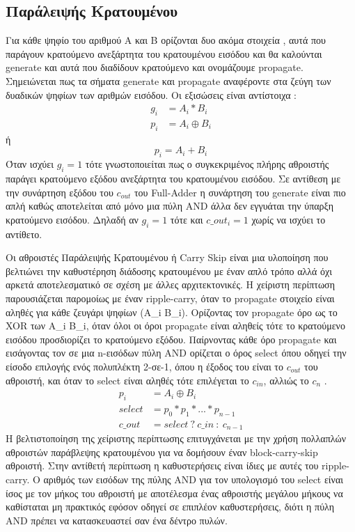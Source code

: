\subsection{Παράλειψής Κρατουμένου}
Για κάθε ψηφίο του αριθμού Α και Β ορίζονται δυο ακόμα στοιχεία , αυτά που παράγουν κρατούμενο ανεξάρτητα του κρατουμένου εισόδου και θα καλούνται generate και αυτά που διαδίδουν κρατούμενο και ονομάζουμε propagate. Σημειώνεται πως τα σήματα generate και propagate αναφέροντε στα ζεύγη των δυαδικών ψηφίων των αριθμών εισόδου. Οι εξισώσεις είναι αντίστοιχα :
\begin{equation}
\begin{split}
    g_i &= A_i * B_i  \\
    p_i &= A_i \oplus B_i 
\end{split}
\end{equation}
ή
\begin{equation*}
    p_i = A_i + B_i
\end{equation*}
Όταν ισχύει $g_i=1$ τότε γνωστοποιείται πως ο συγκεκριμένος πλήρης αθροιστής παράγει κρατούμενο εξόδου ανεξάρτητα του κρατουμένου εισόδου. Σε αντίθεση με την συνάρτηση εξόδου του $c_{out}$ του Full-Adder η συνάρτηση του generate είναι πιο απλή καθώς αποτελείται από μόνο μια πύλη AND άλλα δεν εγγυάται την ύπαρξη κρατούμενο εισόδου. Δηλαδή αν $g_i=1$ τότε και $c\_out_i=1$ χωρίς να ισχύει το αντίθετο. 

Οι αθροιστές Παράλειψής Κρατουμένου ή Carry Skip είναι μια υλοποίηση που βελτιώνει την καθυστέρηση διάδοσης κρατουμένου με έναν απλό τρόπο αλλά όχι αρκετά αποτελεσματικό σε σχέση με άλλες αρχιτεκτονικές. 
Η χείριστη περίπτωση παρουσιάζεται παρομοίως με έναν ripple-carry, όταν το propagate στοιχείο είναι αληθές για κάθε ζευγάρι ψηφίων (A\_i B\_i).
Ορίζοντας τον propagate όρο ως το XOR των Α\_i B\_i, όταν όλοι οι όροι propagate είναι αληθείς τότε το κρατούμενο εισόδου προσδιορίζει το κρατούμενο εξόδου.
Παίρνοντας κάθε όρο propagate και εισάγοντας τον σε μια n-εισόδων πύλη AND ορίζεται ο όρος select όπου οδηγεί την είσοδο επιλογής ενός πολυπλέκτη 2-σε-1, όπου η έξοδος του είναι το $c_{out}$ του αθροιστή, και όταν το select είναι αληθές τότε επιλέγεται το $c_{in}$, αλλιώς το $c_n$ .
\begin{equation}
\begin{split}
    p_i &= A_i \oplus B_i \\
    select &= p_0 * p_1 * ... * p_{n-1} \\
    c\_out &= select\ ?\ c\_in\ :\ c_{n-1} %
\end{split}
\end{equation}
Η βελτιστοποίηση της χείριστης περίπτωσης επιτυγχάνεται με την χρήση πολλαπλών αθροιστών παράβλεψης κρατουμένου για να δομήσουν έναν block-carry-skip αθροιστή. Στην αντίθετή περίπτωση η καθυστερήσεις είναι ίδιες με αυτές του ripple-carry.
Ο αριθμός των εισόδων της πύλης AND για τον υπολογισμό του select είναι ίσος με τον μήκος του αθροιστή με αποτέλεσμα ένας αθροιστής μεγάλου μήκους να καθίσταται μη πρακτικός εφόσον οδηγεί σε επιπλέον καθυστερήσεις, διότι η πύλη AND πρέπει να κατασκευαστεί σαν ένα δέντρο πυλών.   



